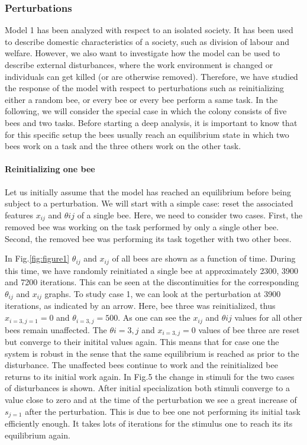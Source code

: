 \subsubsection{Perturbations}
Model 1 has been analyzed with respect to an isolated society. It has been used to describe domestic characteristics of a society, such as division of labour and welfare. However, we also want to investigate how the model can be used to describe external disturbances, where the work environment is changed or individuals can get killed (or are otherwise removed). Therefore, we have studied the response of the model with respect to perturbations such as reinitializing either a random bee, or every bee or every bee perform a same task.
In the following, we will consider the special case in which the colony consists of five bees and two tasks. Before starting a deep analysis, it is important to know that for this specific setup the bees usually reach an equilibrium state in which two bees work on a task and the three others work on the other task. 

\paragraph{Reinitializing one bee}

Let us initially assume that the model has reached an equilibrium before being subject to a perturbation. We will start with a simple case: reset the associated features $x_{ij}$ and $\theta{ij}$ of a single bee. Here, we need to consider two cases. First, the removed bee was working on the task performed by only a single other bee. Second, the removed bee was performing its task together with two other bees.

In Fig.\ref{fig:figure1} $\theta_{ij}$ and $x_{ij}$ of all bees are shown as a function of time. During this time, we have randomly reinitiated a single bee at approximately 2300, 3900 and 7200 iterations. This can be seen at the discontinuities for the corresponding $\theta_{ij}$ and $x_{ij}$ graphs. To study case 1, we can look at the perturbation at 3900 iterations, as indicated by an arrow. Here, bee three was reinitialized, thus $x_{i=3,j=1}=0$ and $\theta_{i=3,j}=500$. As one can see the $x_{ij}$ and $\theta{ij}$ values for all other bees remain unaffected. The $\theta{i=3,j}$ and $x_{i=3,j}=0$ values of bee three are reset but converge to their initital values again. This means that for case one the system is robust in the sense that the same equilibrium is reached as prior to the disturbance. The unaffected bees continue to work and the reinitialized bee returns to its initial work again. In Fig.5 the change in stimuli for the two cases of disturbances is shown. After initial specialization both stimuli converge to a value close to zero and at the time of the perturbation we see a great increase of $s_{j=1}$ after the perturbation. This is due to bee one not performing its initial task efficiently enough. It takes lots of iterations for the stimulus one to reach its its equilibrium again. 

